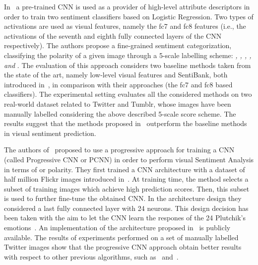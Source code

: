 In~\cite{xu2014visual} a pre-trained CNN is used as a provider of high-level attribute descriptors in order to train two sentiment classifiers based on Logistic Regression. Two types of activations are used as visual features, namely the fc7 and fc8 features (i.e., the activations of the seventh and eighth fully connected layers of the CNN respectively). %
The authors propose a fine-grained sentiment categorization, classifying the polarity of a given image through a 5-scale labelling scheme: \textit{, , , , and }.
The evaluation of this approach considers two baseline methods taken from the state of the art, namely low-level visual features and SentiBank, both introduced in~\cite{borth2013large}, in comparison with their approaches (the fc7 and fc8 based classifiers). The experimental setting evaluates all the considered methods on two real-world dataset related to Twitter and Tumblr, whose images have been manually labelled considering the above described 5-scale score scheme.
The results suggest that the methods proposed in~\cite{xu2014visual} outperform the baseline methods in visual sentiment prediction.%

The authors of~\cite{you2015robust} proposed to use a progressive approach for training a CNN (called Progressive CNN or PCNN) in order to perform visual Sentiment Analysis in terms of  or  polarity. They first trained a CNN architecture with a dataset of half million Flickr images introduced in~\cite{borth2013large}. At training time, the method selects a subset of training images which achieve high prediction scores. Then, this subset is used to further fine-tune the obtained CNN. %
In the architecture design they considered a last fully connected layer with 24 neurons. This design decision has been taken with the aim to let the CNN learn the respones of the 24 Plutchik's emotions~\cite{plutchik1980general}.
An implementation of the architecture proposed in~\cite{you2015robust} is publicly available. The results of experiments performed on a set of manually labelled Twitter images show that the progressive CNN approach obtain better results with respect to other previous algorithms, such as~\cite{borth2013large} and~\cite{yuan2013sentribute}. %


